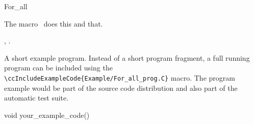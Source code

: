 

\begin{ccRefMacro}{For_all}  %


\ccDefinition
  
The macro \ccRefName\ does this and that.



\ccIsModel


\ccSeeAlso

,
.

\ccExample

A short example program.
Instead of a short program fragment, a full running program can be
included using the 
\verb|\ccIncludeExampleCode{Example/For_all_prog.C}| 
macro. The program example would be part of the source code distribution and
also part of the automatic test suite.

\begin{ccExampleCode}
void your_example_code() {
}
\end{ccExampleCode}


\end{ccRefMacro}



